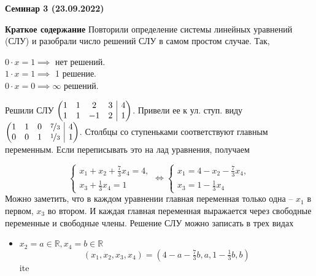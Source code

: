 \documentclass[10pt, a4paper]{extarticle}
\makeatletter
\def \R{\mathbb{R}}
\theoremstyle{definition}
\newenvironment{amatrix}[2]{%
    \left(\begin{array}{@{}*{#1}{c}|*{#2}{c}@{}}
}{%
    \end{array}\right)
}
\makeatother
\begin{document}
\begin{center}
\small
\noindent{}
\end{center}

\large

\begin{center}
\textbf{Семинар 3 (23.09.2022)}
\end{center}

\textbf{Краткое содержание}
Повторили определение системы линейных уравнений (СЛУ) и разобрали число решений СЛУ в самом простом случае. Так,

$0 \cdot x = 1 \implies $ нет решений. \\
$1 \cdot x = 1 \implies $ 1 решение. \\
$0 \cdot x = 0 \implies \infty $ решений.

Решили СЛУ
$\begin{amatrix}{4}{1}
   1 & 1 & 2 & 3 & 4\\
   1 & 1 & -1 & 2 & 1
\end{amatrix}$. 
Привели ее к ул. ступ. виду 
$\begin{amatrix}{4}{1}
    1 & 1 & 0 & \nicefrac{7}{3} & 4\\
    0 & 0 & 1 & \nicefrac{1}{3} & 1
 \end{amatrix}$. Столбцы со ступеньками соответствуют главным переменным. Если переписывать это на лад уравнения, получаем

 \[
    \begin{cases}
        x_1 + x_2 + \frac{7}{3} x_4 = 4, \\
        x_3 + \frac{1}{3}x_4 = 1
    \end{cases}  
    \iff
    \begin{cases}
        x_1 = 4 - x_2 - \frac{7}{3} x_4, \\
        x_3 = 1 - \frac{1}{3}x_4
    \end{cases} 
 \]
 Можно заметить, что в каждом уравнении главная переменная только одна -- $x_1$ в первом, $x_3$ во втором. И каждая главная переменная выражается
 через свободные переменные и свободные члены. Решение СЛУ можно записать в трех видах
 \begin{itemize}
    \item $x_2 = a \in \R, x_4 = b\in \R$
    \[
       \left(x_1, x_2, x_3, x_4\right) = \left(4 - a - \tfrac{7}{3} b, a, 1 - \tfrac{1}{3}b, b\right)
    \]
    ite
 \end{itemize}
\end{document}
